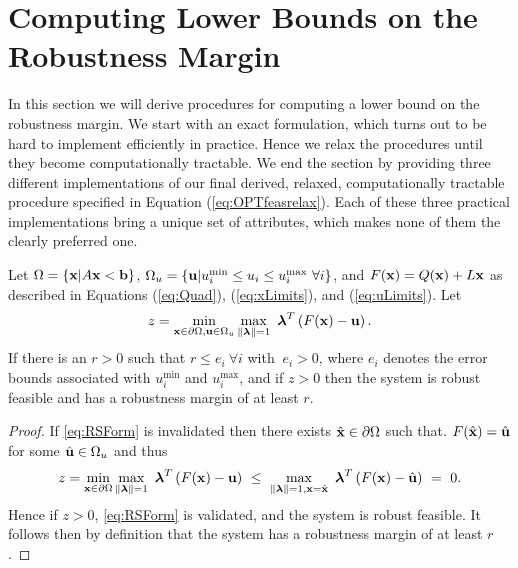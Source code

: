 \section{Computing Lower Bounds on the Robustness Margin} \label{sec:inbdform}  
In this section we will derive procedures for computing a lower bound on the robustness margin. 
We start with an exact formulation, which turns out to be hard to implement efficiently in practice.
Hence we relax the procedures until they become computationally tractable. 
We end the section by providing three different implementations of our final derived, relaxed, computationally tractable procedure specified in Equation (\ref{eq:OPTfeasrelax}).
Each of these three practical implementations bring a unique set of attributes, which makes none of them the clearly preferred one.

\begin{thm}
  Let $\Omega=\{\mathbf{x}| A\mathbf{x}< \mathbf{b}\}$, $\Omega_{u}=\{\mathbf{u}| u^{\min}_i\leq u_i \leq u^{\max}_i \ \forall i \}$, and $F(\mathbf{x})=Q(\mathbf{x})+L\mathbf{x}$ as described in Equations (\ref{eq:Quad}), (\ref{eq:xLimits}), and (\ref{eq:uLimits}). 
  Let
  \[
  z = \min\limits_{\vx\in \partial \Omega, \vu\in \Omega_{u} }\max\limits_{\norm{\vlambda}=1}\ \vlambda^T\left(F(\vx)-\vu\right).
  \]
  If there is an $r>0$ such that $r \leq e_i \ \forall i$ with $\ e_i>0$, where $e_i$ denotes the error bounds associated with $ u^{\min}_i$ and $ u^{\max}_i$, and if $z > 0$ then the system is robust feasible and has a robustness margin of at least $r$.

  \begin{proof} 
    If \cref{eq:RSForm} is invalidated then there exists $\hat{\mathbf{x}} \in \partial\Omega$ such that. $F(\hat{\mathbf{x}})=\hat{\mathbf{u}}$ for some $\hat{\mathbf{u}}\in\Omega_{u}$ and thus
    \[
    z = \min\limits_{\vx\in \partial \Omega}\max\limits_{\norm{\vlambda}=1}\ \vlambda^T\left(F(\vx)-\vu\right) ~\leq~ \max\limits_{\norm{\vlambda}=1, \vx=\hat{\vx}}\ \vlambda^T\left(F(\vx)-\hat{\vu}\right) ~=~ 0.
    \]
    Hence if $z>0$, \cref{eq:RSForm} is validated, and the system is robust feasible.
    It follows then by definition that the system has a robustness margin of at least $r$.
  \end{proof}
\end{thm}


